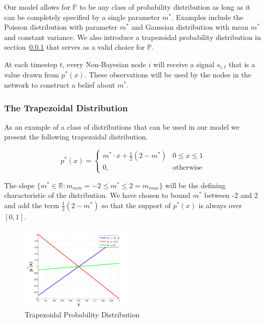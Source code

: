 \documentclass[letterpaper, 10pt, conference]{ieeeconf}
\begin{document}
Our model allows for $\mathbb{P}$ to be any class of probability distribution as long as it can be completely specified by a single parameter $m^*$.  Examples include the Poisson distribution with parameter $m^*$ and Gaussian distribution with mean $m^*$ and constant variance.  We also introduce a trapezoidal probability distribution in section~\ref{sec:trapezoidal_distribution} that serves as a valid choice for $\mathbb{P}$.

At each timestep $t$, every Non-Bayesian node $i$ will receive a signal $s_{i,t}$ that is a value drawn from $p^*(x)$.  These observations will be used by the nodes in the network to construct a belief about $m^*$.

\subsubsection{The Trapezoidal Distribution}
\label{sec:trapezoidal_distribution}

As an example of a class of distributions that can be used in our model we present the following trapezoidal distribution.

\begin{equation}
p^*(x)=\begin{cases}
m^* \cdot x + \frac{1}{2}(2-m^*) & 0 \le x \le 1 \\
0, & \text{otherwise}
\end{cases}
\end{equation}

The slope $\{ m^* \in \mathbb{R} : m_{min} = -2 \le m^* \le 2 = m_{max} \}$ will be the defining characteristic of the distribution.  We have chosen to bound $m^*$ between -2 and 2 and add the term $\frac{1}{2}(2-m^*)$ so that the support of $p^*(x)$  is always over $[0,1]$.

\begin{figure}[h]
\centering
\includegraphics[width=0.48\textwidth]{trapezoidalDistribution}
\caption{Trapezoidal Probability Distribution}
\label{fig:trapezoidal}
\end{figure}
\end{document}
